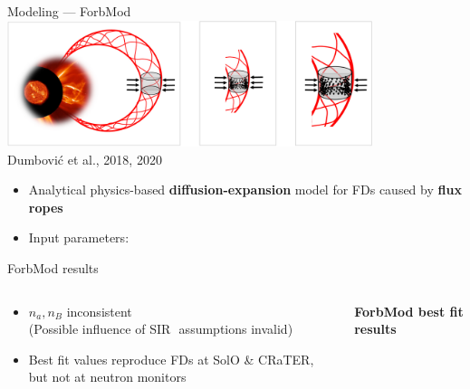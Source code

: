 \documentclass[10pt,aspectratio=169,usenames,dvipsnames]{beamer}
\newcommand{\textarrow}{\,{\small\faLongArrowAltRight}\,}
\begin{document}
\begin{frame}{Modeling --- ForbMod}
	\centering\includegraphics[width=0.8\textwidth]{images/forbmod_schematic.jpg}\\[-3mm]
	{\footnotesize\flushright Dumbović et al., 2018, 2020}
	
	\begin{itemize}
		\item Analytical physics-based \textbf{diffusion-expansion} model for FDs caused by \textbf{flux ropes}
		\item Input parameters:\\[2mm]
        \centering
	\end{itemize}
\end{frame}

\begin{frame}{ForbMod results}
	\begin{columns}
		\begin{column}{0.28\textwidth}
			\begin{itemize}
				\item $n_a, n_B$ inconsistent\\
				{\small (Possible influence of SIR \textarrow assumptions invalid)}
				\item Best fit values reproduce FDs at SolO \& CRaTER, but not at neutron monitors
			\end{itemize}
		\end{column}
		\begin{column}{0.7\textwidth}
			\centering
            \textbf{ForbMod best fit results}
			\scalebox{0.65}{}
		\end{column}
	\end{columns}
\end{frame}
\end{document}
